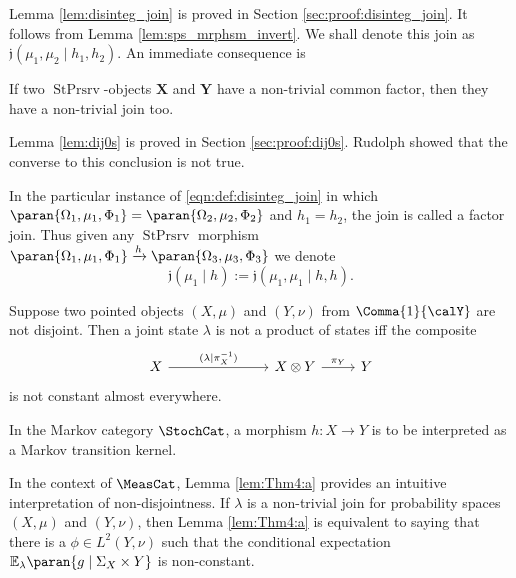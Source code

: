 \documentclass[12pt,oneside,pb-diagram]{article}
\DeclareMathOperator{\sps}{StPrsrv}
\newcommand{\join}{\mathfrak{j}}
\begin{document}
Lemma \ref{lem:disinteg_join} is proved in Section \ref{sec:proof:disinteg_join}. It follows from Lemma \ref{lem:sps_mrphsm_invert}. We shall denote this join as $\join(\mu_1, \mu_2 \mid h_1, h_2)$. An immediate consequence is

\begin{lemma} \label{lem:dij0s}
	\cite[Thm 3.5]{Rue2006join} If two $\sps$-objects $\mathbf{X}$ and $\mathbf{Y}$ have a non-trivial common factor, then they have a non-trivial join too.
\end{lemma}

Lemma \ref{lem:dij0s} is proved in Section \ref{sec:proof:dij0s}.
Rudolph \cite{Rudolph1979join} showed that the converse to this conclusion is not true.

\begin{definition} 
	In the particular instance of \eqref{eqn:def:disinteg_join} in which $\paran{ \Omega_1, \mu_1, \Phi_1 } = \paran{ \Omega_2, \mu_2, \Phi_2 }$ and $h_1=h_2$, the join is called a factor join. Thus given any $\sps$ morphism $\paran{ \Omega_1, \mu_1, \Phi_1 } \xrightarrow{h} \paran{ \Omega_3, \mu_3, \Phi_3 }$ we denote
	\[\join( \mu_1 \mid h ) := \join(\mu_1, \mu_1 \mid h, h) . \]
\end{definition}

\begin{lemma} \label{lem:Thm4:a}
	\cite[Thm 4]{LemanczykEtAl1993gaussian} Suppose two pointed objects $(X, \mu)$ and $(Y, \nu)$ from $\Comma{1}{\calY}$ are not disjoint. Then a joint state $\lambda$ is not a product of states iff the composite 
	\[\begin{tikzcd}
		X \arrow[rrr, "(\lambda| \pi_X^{-1})"] &&& X \otimes Y \arrow[r, "\pi_Y"] & Y
	\end{tikzcd}\]
	is not constant almost everywhere.
\end{lemma}

\begin{Erg}{}{}
	In the Markov category $\StochCat$, a morphism $h:X\to Y$ is to be interpreted as a Markov transition kernel.
\end{Erg}

\begin{Erg}{}{} 
	In the context of $\MeasCat$, Lemma \ref{lem:Thm4:a} provides an intuitive interpretation of non-disjointness. If $\lambda$ is a non-trivial join for probability spaces $(X, \mu)$ and $(Y, \nu)$, then Lemma \ref{lem:Thm4:a} is equivalent to saying that there is a $\phi \in L^2(Y,\nu)$ such that the conditional expectation $\mathbb{E}_{\lambda} \paran{g \mid \Sigma_X \times Y }$ is non-constant.
\end{Erg}
\end{document}
